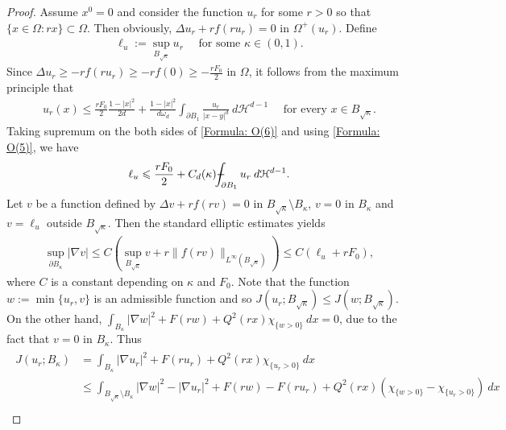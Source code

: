 \documentclass[11pt,reqno]{amsart}
\begin{document}
\begin{proof}
	Assume $x^{0}=0$ and consider the function $u_{r}$ for some $r>0$ so that $\{x\in\Omega\colon rx\}\subset\Omega$. Then obviously, $\Delta u_{r}+rf(ru_{r})=0$ in $\varOmega^{+}(u_{r})$. Define
	\begin{align}\label{Formula: O(5)}
		\ell_{u}:=\sup_{B_{\sqrt{\kappa}}}u_{r}\quad\text{ for some }\kappa\in(0,1).
	\end{align}
	Since $\Delta u_{r}\geqslant-rf(ru_{r})\geqslant-rf(0)\geqslant-\frac{rF_{0}}{2}$ in $\Omega$, it follows from the maximum principle that
	\begin{align}\label{Formula: O(6)}
		u_{r}(x)\leqslant\frac{rF_{0}}{2}\frac{1-|x|^{2}}{2d}+\frac{1-|x|^{2}}{d\omega_{d}}\int_{\partial B_{1}}\frac{u_{r}}{|x-y|^{d}}\:d\mathcal{H}^{d-1}\quad\text{ for every }x\in B_{\sqrt{\kappa}}.
	\end{align}
    Taking supremum on the both sides of \eqref{Formula: O(6)} and using \eqref{Formula: O(5)}, we have
    \begin{align}\label{Formula: O(7)}
    	\ell_{u}\leqslant\frac{rF_{0}}{2}+C_{d}(\kappa)\dashint_{\partial B_{1}}u_{r}\:d\mathcal{H}^{d-1}.
    \end{align}
    Let $v$ be a function defined by $\Delta v+rf(rv)=0$ in $B_{\sqrt{\kappa}}\setminus B_{\kappa}$, $v=0$ in $B_{\kappa}$ and $v=\ell_{u}$ outside $B_{\sqrt{\kappa}}$. Then the standard elliptic estimates yields
    \begin{align}\label{Formula: O(8)}
    	\sup_{\partial B_{\kappa}}|\nabla v|\leqslant C(\sup_{B_{\sqrt{\kappa}}}v+r\|f(rv)\|_{L^{\infty}(B_{\sqrt{\kappa}})})\leqslant C(\ell_{u}+rF_{0}),
    \end{align}
    where $C$ is a constant depending on $\kappa$ and $F_{0}$. Note that the function $w:=\min\{u_{r},v\}$ is an admissible function and so $J(u_{r};B_{\sqrt{\kappa}})\leqslant J(w;B_{\sqrt{\kappa}})$. On the other hand, $\int_{B_{\kappa}}|\nabla w|^{2}+F(rw)+Q^{2}(rx)\chi_{\{w>0\}}\:dx=0$, due to the fact that $v=0$ in $B_{\kappa}$. Thus
    \begin{align}\label{Formula: O(9)}
    	\begin{alignedat}{5}
    		J(u_{r};B_{\kappa})&=\int_{B_{\kappa}}|\nabla u_{r}|^{2}+F(ru_{r})+Q^{2}(rx)\chi_{\{u_{r}>0\}}\:dx\\
    		&\leqslant\int_{B_{\sqrt{\kappa}}\setminus B_{\kappa}}|\nabla w|^{2}-|\nabla u_{r}|^{2}+F(rw)-F(ru_{r})+Q^{2}(rx)\left(\chi_{\{w>0\}}-\chi_{\{u_{r}>0\}}\right)\:dx\\

\end{alignedat}
\end{align}
\end{proof}
\end{document}
